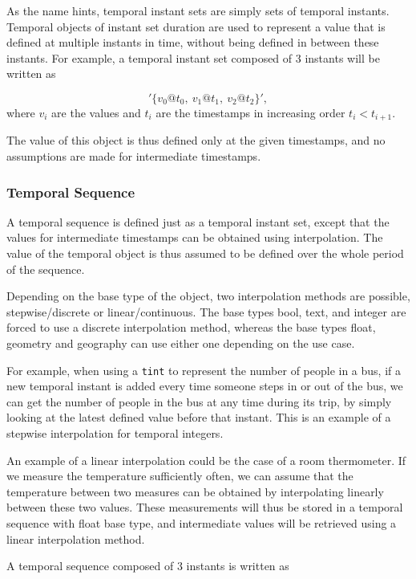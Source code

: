 As the name hints, temporal instant sets are simply sets of temporal instants. Temporal objects of instant set duration are used to represent a value that is defined at multiple instants in time, without being defined in between these instants. For example, a temporal instant set composed of 3 instants will be written as

\[
    '\{v_0@t_0,\ v_1@t_1,\ v_2@t_2\}',
\]
where \(v_i\) are the values and \(t_i\) are the timestamps in increasing order \(t_i < t_{i+1}\).

The value of this object is thus defined only at the given timestamps, and no assumptions are made for intermediate timestamps.

\subsubsection{Temporal Sequence}
\label{section:mobilitydb_seq}

A temporal sequence is defined just as a temporal instant set, except that the values for intermediate timestamps can be obtained using interpolation. The value of the temporal object is thus assumed to be defined over the whole period of the sequence.

Depending on the base type of the object, two interpolation methods are possible, stepwise/discrete or linear/continuous. The base types bool, text, and integer are forced to use a discrete interpolation method, whereas the base types float, geometry and geography can use either one depending on the use case.

For example, when using a \lstinline{tint} to represent the number of people in a bus, if a new temporal instant is added every time someone steps in or out of the bus, we can get the number of people in the bus at any time during its trip, by simply looking at the latest defined value before that instant. This is an example of a stepwise interpolation for temporal integers.

An example of a linear interpolation could be the case of a room thermometer. If we measure the temperature sufficiently often, we can assume that the temperature between two measures can be obtained by interpolating linearly between these two values. These measurements will thus be stored in a temporal sequence with float base type, and intermediate values will be retrieved using a linear interpolation method.

A temporal sequence composed of 3 instants is written as

